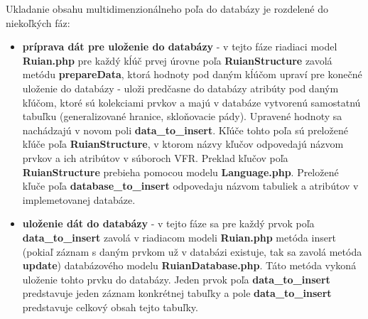 Ukladanie obsahu multidimenzionálneho poľa do databázy je rozdelené do niekoľkých fáz:
\begin{itemize}
    \item {{\bf príprava dát pre uloženie do databázy} - v tejto fáze riadiaci model {\bf Ruian.php} pre každý kĺúč prvej úrovne poľa {\bf RuianStructure} zavolá metódu {\bf prepareData}, ktorá hodnoty pod daným kĺúčom upraví pre konečné uloženie do databázy - uloži predčasne do databázy atribúty pod daným kľúčom, ktoré sú kolekciami prvkov a majú v databáze vytvorenú samostatnú tabuľku (generalizované hranice, skloňovacie pády)}. Upravené hodnoty sa nachádzajú v novom poli {\bf data\_to\_insert}. Kľúče tohto poľa sú preložené kľúče poľa {\bf RuianStructure}, v ktorom názvy kľučov odpovedajú názvom prvkov a ich atribútov v súboroch VFR. Preklad kľučov poľa {\bf RuianStructure} prebieha pomocou modelu {\bf Language.php}. Preložené kľuče poľa {\bf database\_to\_insert} odpovedaju názvom tabuliek a atribútov v implemetovanej databáze.
    \item {\bf uloženie dát do databázy} - v tejto fáze sa pre každý prvok poľa {\bf data\_to\_insert} zavolá v riadiacom modeli {\bf Ruian.php} metóda insert (pokiaľ záznam s daným prvkom už v databázi existuje, tak sa zavolá metóda {\bf update}) databázového modelu {\bf RuianDatabase.php}. Táto metóda vykoná uloženie tohto prvku do databázy. Jeden prvok poľa {\bf data\_to\_insert} predstavuje jeden záznam konkrétnej tabuľky a pole {\bf data\_to\_insert} predstavuje celkový obsah tejto tabuľky.
\end{itemize}

